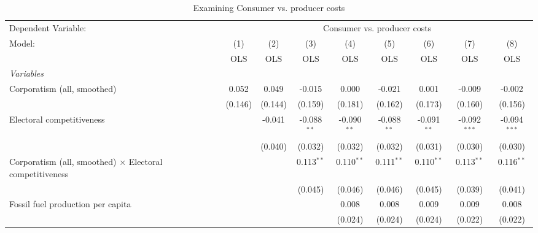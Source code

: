 
\begin{table}[htbp]
   \caption{Examining Consumer vs. producer costs}
   \centering
   \begin{tabular}{lcccccccc}
      \toprule
      Dependent Variable: & \multicolumn{8}{c}{Consumer vs. producer costs}\\
      Model:                                                          & (1)     & (2)     & (3)           & (4)           & (5)           & (6)           & (7)            & (8)\\  
                                                                      &  OLS    & OLS     & OLS           & OLS           & OLS           & OLS           & OLS            & OLS\\  
      \midrule
      \emph{Variables}\\
      Corporatism (all, smoothed)                                     & 0.052   & 0.049   & -0.015        & 0.000         & -0.021        & 0.001         & -0.009         & -0.002\\   
                                                                      & (0.146) & (0.144) & (0.159)       & (0.181)       & (0.162)       & (0.173)       & (0.160)        & (0.156)\\   
      Electoral competitiveness                                       &         & -0.041  & -0.088$^{**}$ & -0.090$^{**}$ & -0.088$^{**}$ & -0.091$^{**}$ & -0.092$^{***}$ & -0.094$^{***}$\\   
                                                                      &         & (0.040) & (0.032)       & (0.032)       & (0.032)       & (0.031)       & (0.030)        & (0.030)\\   
      Corporatism (all, smoothed) $\times$ Electoral competitiveness  &         &         & 0.113$^{**}$  & 0.110$^{**}$  & 0.111$^{**}$  & 0.110$^{**}$  & 0.113$^{**}$   & 0.116$^{**}$\\   
                                                                      &         &         & (0.045)       & (0.046)       & (0.046)       & (0.045)       & (0.039)        & (0.041)\\   
      Fossil fuel production per capita                               &         &         &               & 0.008         & 0.008         & 0.009         & 0.009          & 0.008\\   
                                                                      &         &         &               & (0.024)       & (0.024)       & (0.024)       & (0.022)        & (0.022)\\   

\end{tabular}
\end{table}
